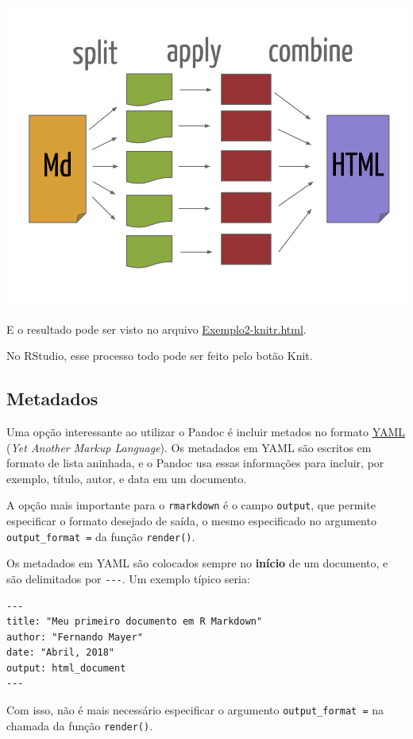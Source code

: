 \documentclass[10pt,a4paper]{book}
\begin{document}
\begin{center}\includegraphics[width=0.8\linewidth]{img/split_apply_combine} \end{center}

E o resultado pode ser visto no arquivo
\href{exemplos/Exemplo2-knitr.html}{Exemplo2-knitr.html}.

No RStudio, esse processo todo pode ser feito pelo botão Knit.

\subsection{Metadados}\label{metadados}

Uma opção interessante ao utilizar o Pandoc é incluir metados no formato
\href{http://yaml.org/}{YAML} (\emph{Yet Another Markup Language}). Os
metadados em YAML são escritos em formato de lista aninhada, e o Pandoc
usa essas informações para incluir, por exemplo, título, autor, e data
em um documento.

A opção mais importante para o \texttt{rmarkdown} é o campo
\texttt{output}, que permite especificar o formato desejado de saída, o
mesmo especificado no argumento \texttt{output\_format\ =} da função
\texttt{render()}.

Os metadados em YAML são colocados sempre no \textbf{início} de um
documento, e são delimitados por \texttt{-\/-\/-}. Um exemplo típico
seria:

\begin{verbatim}
---
title: "Meu primeiro documento em R Markdown"
author: "Fernando Mayer"
date: "Abril, 2018"
output: html_document
---
\end{verbatim}

Com isso, não é mais necessário especificar o argumento
\texttt{output\_format\ =} na chamada da função \texttt{render()}.
\end{document}
